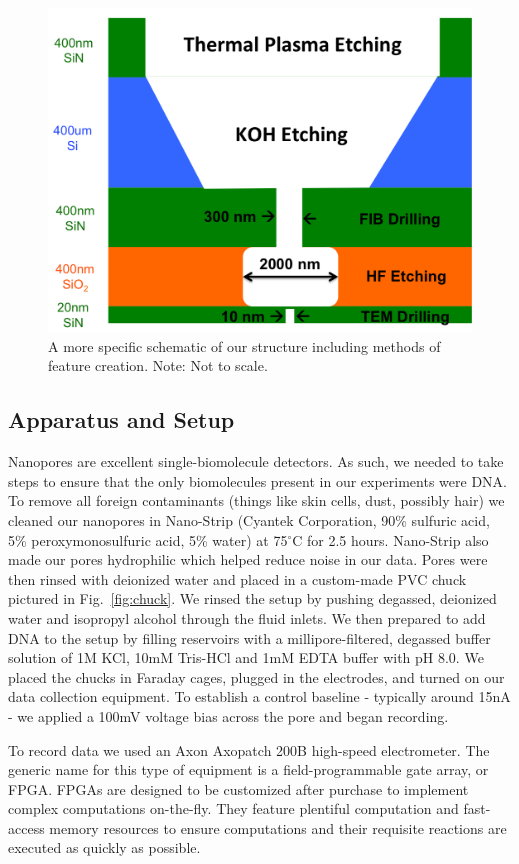 \documentclass[aps,prl,preprint,groupedaddress]{revtex4}
\begin{document}
\begin{figure}[h]
\centering
\includegraphics[width=.45\textwidth]{figures/structure-schematic}
\caption{A more specific schematic of our structure including methods of feature creation. Note: Not to scale.}
\label{fig:structure-schematic}
\end{figure}

\subsection{Apparatus and Setup}

Nanopores are excellent single-biomolecule detectors.
As such, we needed to take steps to ensure that the only biomolecules present in our experiments were DNA.
To remove all foreign contaminants (things like skin cells, dust, possibly hair) we cleaned our nanopores in Nano-Strip (Cyantek  Corporation, 90\% sulfuric acid, 5\% peroxymonosulfuric acid, 5\% water) at 75$^\circ$C for 2.5 hours.
Nano-Strip also made our pores hydrophilic which helped reduce noise in our data.
Pores were then rinsed with deionized water and placed in a custom-made PVC chuck pictured in Fig.~\ref{fig:chuck}.
We rinsed the setup by pushing degassed, deionized water and isopropyl alcohol through the fluid inlets.
We then prepared to add DNA to the setup by filling reservoirs with a millipore-filtered, degassed buffer solution of 1M KCl, 10mM Tris-HCl and 1mM EDTA buffer with pH 8.0.
We placed the chucks in Faraday cages, plugged in the electrodes, and turned on our data collection equipment.
To establish a control baseline - typically around 15nA - we applied a 100mV voltage bias across the pore and began recording.

To record data we used an Axon Axopatch 200B high-speed electrometer.
The generic name for this type of equipment is a field-programmable gate array, or FPGA.
FPGAs are designed to be customized after purchase to implement complex computations on-the-fly.
They feature plentiful computation and fast-access memory resources to ensure computations and their requisite reactions are executed as quickly as possible.
\end{document}
